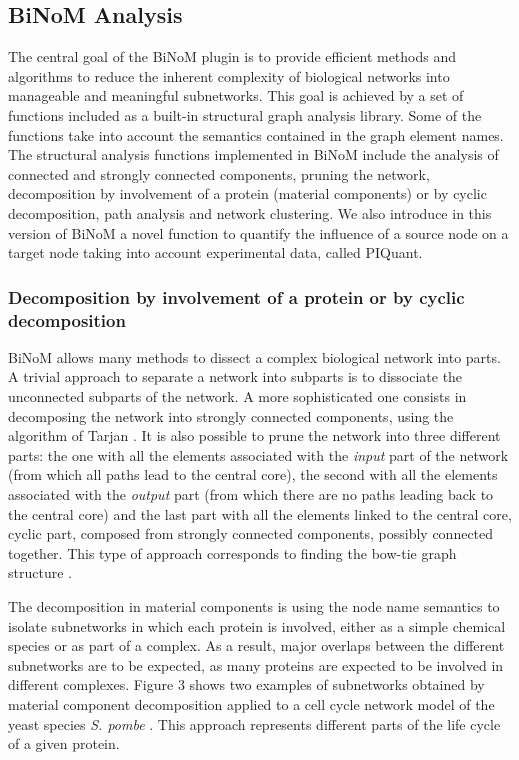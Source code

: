 \documentclass[10pt]{bmc_article}
\newenvironment{bmcformat}{\baselineskip20pt\sloppy\setboolean{publ}{false}}{\baselineskip20pt\sloppy}
\begin{document}
\begin{bmcformat}
\subsection*{BiNoM Analysis}
The central goal of the BiNoM plugin is to provide efficient methods
and algorithms to reduce the inherent complexity of biological networks into
manageable and meaningful subnetworks. This goal is achieved by a set of
functions included as a built-in structural graph analysis library. Some of the functions take into
account the semantics contained in the graph element names.
The structural analysis functions implemented in BiNoM include the analysis of
connected and strongly connected components, pruning the network, decomposition
by involvement of a protein (material components) or by cyclic decomposition, path analysis and network clustering.
We also introduce in this version of BiNoM a novel function to quantify the
influence of a source node on a target node taking into account experimental data, called PIQuant.

\subsubsection*{Decomposition by involvement of a protein or by cyclic decomposition}

BiNoM allows many methods to dissect a complex biological network into parts.
A trivial approach to separate a network into subparts is to dissociate the unconnected subparts
of the network. A more sophisticated one consists in decomposing the network into
strongly connected components, using the algorithm of Tarjan
\cite{tarjan1972depth}. It is also possible to prune the network into three different parts:
the one with all the elements associated with the \emph{input} part of the network (from which all paths lead to the central core), the
second with all the elements associated with the \emph{output} part (from which there are no paths leading back to the central core) and the last
part with all the elements linked to the central core, cyclic part, composed from strongly connected components, possibly connected together. 
This type of approach corresponds to finding the bow-tie graph structure \cite{broder2000graph}.

The decomposition in material components is using the node name semantics to
isolate subnetworks in which each protein is involved, either as a simple chemical species or as part of a complex. As a result, major overlaps between
the different subnetworks are to be expected, as many proteins are expected to be involved in
different complexes. Figure 3 shows two examples of subnetworks
obtained by material component decomposition applied to a cell cycle network
model of the yeast species \textit{S. pombe} \cite{novak1998model}. This approach represents
different parts of the life cycle of a given protein.


\end{bmcformat}
\end{document}
